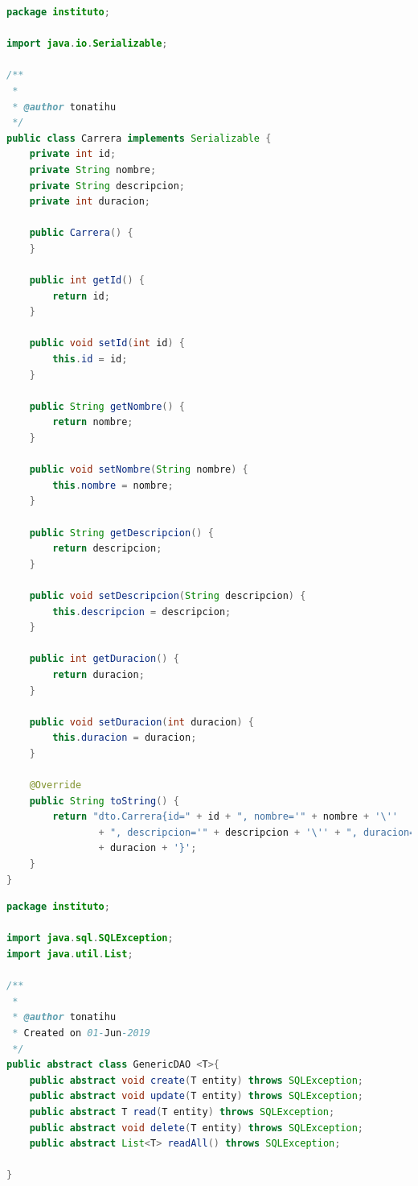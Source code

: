 \documentclass[a4paper,12pt]{article}
\begin{document}
\begin{lstlisting}[language=Java, style=customJava, 
caption={Carrera.java},captionpos=b,basicstyle=\fontfamily{cmss}\small]
package instituto;

import java.io.Serializable;

/**
 *
 * @author tonatihu
 */
public class Carrera implements Serializable {
    private int id;
    private String nombre;
    private String descripcion;
    private int duracion;

    public Carrera() {
    }

    public int getId() {
        return id;
    }

    public void setId(int id) {
        this.id = id;
    }

    public String getNombre() {
        return nombre;
    }

    public void setNombre(String nombre) {
        this.nombre = nombre;
    }

    public String getDescripcion() {
        return descripcion;
    }

    public void setDescripcion(String descripcion) {
        this.descripcion = descripcion;
    }

    public int getDuracion() {
        return duracion;
    }

    public void setDuracion(int duracion) {
        this.duracion = duracion;
    }

    @Override
    public String toString() {
        return "dto.Carrera{id=" + id + ", nombre='" + nombre + '\'' 
                + ", descripcion='" + descripcion + '\'' + ", duracion=" 
                + duracion + '}';
    }
}

\end{lstlisting}

\begin{lstlisting}[language=Java, style=customJava, 
caption={GenericDAO.java},captionpos=b,basicstyle=\fontfamily{cmss}\small]
package instituto;

import java.sql.SQLException;
import java.util.List;

/**
 *
 * @author tonatihu
 * Created on 01-Jun-2019
 */
public abstract class GenericDAO <T>{
    public abstract void create(T entity) throws SQLException;
    public abstract void update(T entity) throws SQLException;
    public abstract T read(T entity) throws SQLException;
    public abstract void delete(T entity) throws SQLException;
    public abstract List<T> readAll() throws SQLException;

}
\end{lstlisting}
\end{document}
